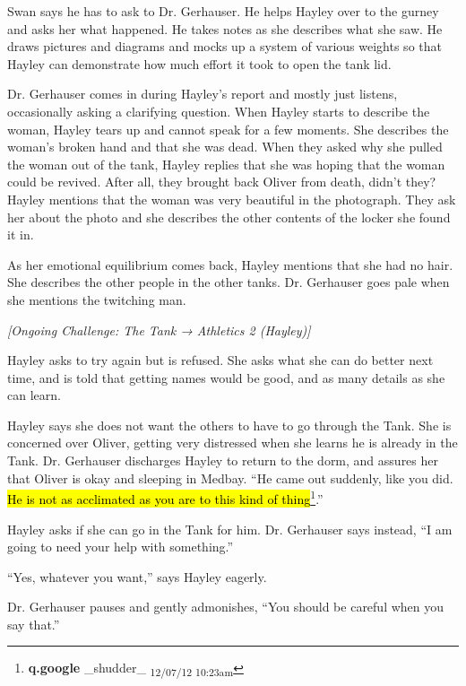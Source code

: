 Swan says he has to ask to Dr. Gerhauser.  He helps Hayley over to the gurney and asks her what happened.  He takes notes as she describes what she saw.  He draws pictures and diagrams and mocks up a system of various weights so that Hayley can demonstrate how much effort it took to open the tank lid.



Dr. Gerhauser comes in during Hayley's report and mostly just listens, occasionally asking a clarifying question.  When Hayley starts to describe the woman, Hayley tears up and cannot speak for a few moments.  She describes the woman's broken hand and that she was dead.  When they asked why she pulled the woman out of the tank, Hayley replies that she was hoping that the woman could be revived. After all, they brought back Oliver from death, didn't they?  Hayley mentions that the woman was very beautiful in the photograph.  They ask her about the photo and she describes the other contents of the locker she found it in.



As her emotional equilibrium comes back, Hayley mentions that she had no hair.  She describes the other people in the other tanks.  Dr. Gerhauser goes pale when she mentions the twitching man.



\textit{{[}Ongoing Challenge: The Tank → Athletics 2 (Hayley){]}}



Hayley asks to try again but is refused.  She asks what she can do better next time, and is told that getting names would be good, and as many details as she can learn.



Hayley says she does not want the others to have to go through the Tank.  She is concerned over Oliver, getting very distressed when she learns he is already in the Tank.  Dr. Gerhauser discharges Hayley to return to the dorm, and assures her that Oliver is okay and sleeping in Medbay.  ``He came out suddenly, like you did.  \hl{He is not as acclimated as you are to this kind of thing}\footnote{\textbf{q.google }\_shudder\_ \textsubscript{12/07/12 10:23am}}.''



Hayley asks if she can go in the Tank for him.  Dr. Gerhauser says instead, ``I am going to need your help with something.''

``Yes, whatever you want,'' says Hayley eagerly.

Dr. Gerhauser pauses and gently admonishes, ``You should be careful when you say that.''

